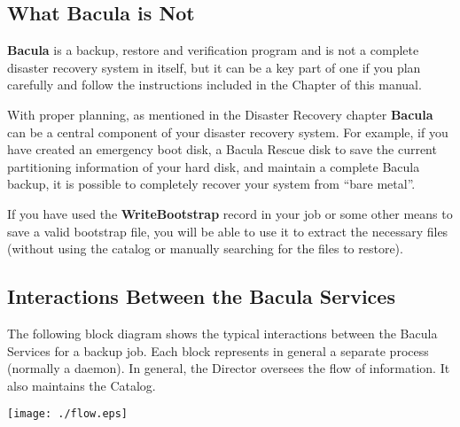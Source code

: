 \subsection*{What Bacula is Not}

{\bf Bacula} is a backup, restore and verification program and is not a
complete disaster recovery system in itself, but it can be a key part of one
if you plan carefully and follow the instructions included in the 
 Chapter of this manual. 

With proper planning, as mentioned in the Disaster Recovery chapter {\bf
Bacula} can be a central component of your disaster recovery system. For
example, if you have created an emergency boot disk, a Bacula Rescue disk to
save the current partitioning information of your hard disk, and maintain a
complete Bacula backup, it is possible to completely recover your system from
``bare metal''. 

If you have used the {\bf WriteBootstrap} record in your job or some other
means to save a valid bootstrap file, you will be able to use it to extract
the necessary files (without using the catalog or manually searching for the
files to restore). 

\subsection*{Interactions Between the Bacula Services}

The following block diagram shows the typical interactions between the Bacula
Services for a backup job. Each block represents in general a separate process
(normally a daemon). In general, the Director oversees the flow of
information. It also maintains the Catalog. 

\texttt{[image: ./flow.eps]} 
